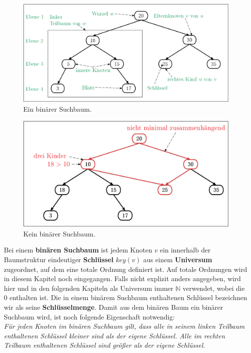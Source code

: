 \documentclass[a4paper,12pt]{article}
\begin{document}
\begin{figure}[H]
	\centering
	\includegraphics[width= 1\textwidth]{Medien/Einleitung/ioSuchbaum}
	\caption{Ein binärer Suchbaum. }
	\label{fig:ioSuchbaum}
\end{figure}
\begin{figure}[H]
	\centering
	\includegraphics[width= 1\textwidth]{Medien/Einleitung/nioSuchbaum}
	\caption{Kein binärer Suchbaum. }
	\label{fig:nioSuchbaum}
\end{figure}

\noindent Bei einem \textbf{binären Suchbaum} ist jedem Knoten $v$ ein innerhalb der Baumstruktur eindeutiger \textbf{Schlüssel} $\mathit{key}\left(v\right)$ aus einem \textbf{Universum} zugeordnet, auf dem eine totale Ordnung definiert ist. Auf totale Ordnungen wird in diesem Kapitel noch eingegangen. Falls nicht explizit anders angegeben, wird hier und in den folgenden Kapiteln als Universum immer $\mathbb{N}$ verwendet, wobei die $0$ enthalten ist. Die in einem binärem Suchbaum enthaltenen Schlüssel bezeichnen wir als seine \textbf{Schlüsselmenge}.  Damit aus dem binären Baum ein binärer Suchbaum wird, ist noch folgende Eigenschaft notwendig:\\
\textit{Für jeden Knoten im binären Suchbaum gilt, dass alle in seinem linken Teilbaum enthaltenen Schlüssel kleiner sind als der eigene Schlüssel. Alle im rechten Teilbaum enthaltenen Schlüssel sind größer als der eigene Schlüssel.} \\
\end{document}
